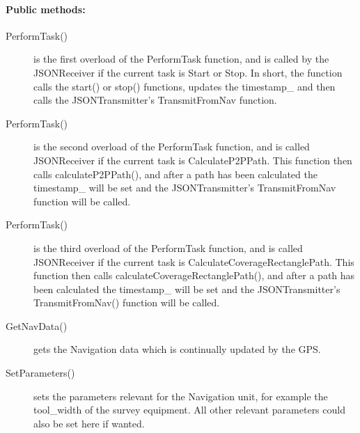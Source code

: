 \paragraph{Public methods:}
\begin{adjustwidth}{2.5em}{0pt}\begin{description}
		\item [PerformTask()] is the first overload of the PerformTask function, and is called by the JSONReceiver if the current task is Start or Stop. In short, the function calls the start() or stop() functions, updates the timestamp_ and then calls the JSONTransmitter's TransmitFromNav function.
		\item [PerformTask()] is the second overload of the PerformTask function, and is called JSONReceiver if the current task is CalculateP2PPath. This function then calls calculateP2PPath(), and after a path has been calculated the timestamp_ will be set and the JSONTransmitter's TransmitFromNav function will be called.
		\item [PerformTask()] is the third overload of the PerformTask function, and is called JSONReceiver if the current task is CalculateCoverageRectanglePath. This function then calls calculateCoverageRectanglePath(), and after a path has been calculated the timestamp_ will be set and the JSONTransmitter's TransmitFromNav() function will be called.
		\item [GetNavData()] gets the Navigation data which is continually updated by the GPS.
		\item [SetParameters()] sets the parameters relevant for the Navigation unit, for example the tool_width of the survey equipment. All other relevant parameters could also be set here if wanted.
\end{description}\end{adjustwidth}

